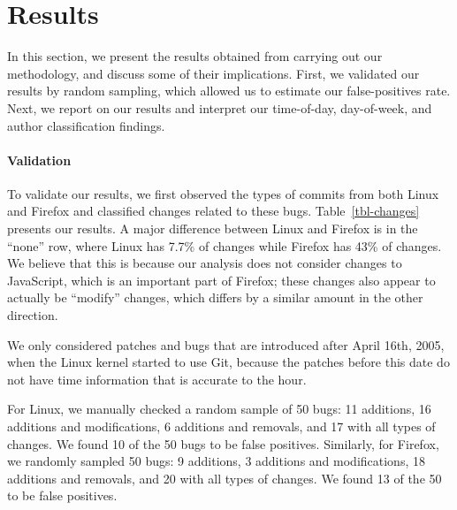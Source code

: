 \section{Results}
\label{sec-results}
In this section, we present the results obtained from carrying out our
methodology, and discuss some of their implications. First, we validated
our results by random sampling, which allowed us to estimate our
false-positives rate. Next, we report on our results and interpret
our time-of-day, day-of-week, and author classification findings.

\paragraph{Validation} 
To validate our results, we first observed the types of commits from both Linux
and Firefox and classified changes related to these bugs.
Table~\ref{tbl-changes} presents our results. A major difference
between Linux and Firefox is in the ``none'' row, where Linux has
7.7\% of changes while Firefox has 43\% of changes. We believe that
this is because our analysis does not consider changes to JavaScript,
which is an important part of Firefox; these changes also appear to
actually be ``modify'' changes, which differs by a similar amount
in the other direction.

We only considered patches and bugs that are introduced after April 16th, 2005, when
the Linux kernel started to use Git, because the patches before this date do not have 
time information that is accurate to the hour.




For Linux, we manually checked a random sample of 50 bugs: 11
additions, 16 additions and modifications, 6 additions and removals,
and 17 with all types of changes. We found 10 of the 50 bugs to be
false positives. Similarly, for Firefox, we randomly sampled 50 bugs:
9 additions, 3 additions and modifications, 18 additions and removals,
and 20 with all types of changes. We found 13 of the 50 to be false
positives. 

